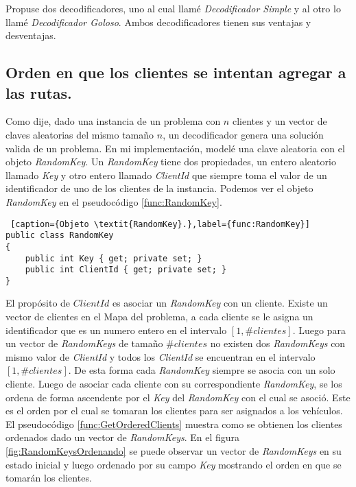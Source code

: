 \bigskip

Propuse dos decodificadores, uno al cual llamé \textit{Decodificador Simple} y al otro lo llamé \textit{Decodificador Goloso}. Ambos decodificadores tienen sus ventajas y desventajas.

\subsection{Orden en que los clientes se intentan agregar a las rutas.}\label{sec:ordenDeco}

Como dije, dado una instancia de un problema con $n$ clientes y un vector de claves aleatorias del mismo tamaño $n$, un decodificador genera una solución valida de un problema. En mi implementación, modelé una clave aleatoria con el objeto \textit{RandomKey}. Un \textit{RandomKey} tiene dos propiedades, un entero aleatorio llamado \textit{Key} y otro entero llamado \textit{ClientId} que siempre toma el valor de un identificador de uno de los clientes de la instancia. Podemos ver el objeto \textit{RandomKey} en el pseudocódigo \ref{func:RandomKey}.

\bigskip

\begin{lstlisting} [caption={Objeto \textit{RandomKey}.},label={func:RandomKey}]
public class RandomKey
{        
	public int Key { get; private set; }
	public int ClientId { get; private set; }
}
\end{lstlisting}

\bigskip

El propósito de $ClientId$ es asociar un \textit{RandomKey} con un cliente. Existe un vector de clientes en el Mapa del problema, a cada cliente se le asigna un identificador que es un numero entero en el intervalo $[1, \#clientes]$. Luego para un vector de \textit{RandomKeys} de tamaño $\#clientes$ no existen dos \textit{RandomKeys} con mismo valor de \textit{ClientId} y todos los \textit{ClientId} se encuentran en el intervalo $[1, \#clientes]$. De esta forma cada \textit{RandomKey} siempre se asocia con un solo cliente. Luego de asociar cada cliente con su correspondiente \textit{RandomKey}, se los ordena de forma ascendente por el \textit{Key} del \textit{RandomKey} con el cual se asoció. Este es el orden por el cual se tomaran los clientes para ser asignados a los vehículos. El pseudocódigo \ref{func:GetOrderedClients} muestra como se obtienen los clientes ordenados dado un vector de \textit{RandomKeys}. En el figura \ref{fig:RandomKeysOrdenando} se puede observar un vector de \textit{RandomKeys} en su estado inicial y luego ordenado por su campo \textit{Key} mostrando el orden en que se tomarán los clientes.

